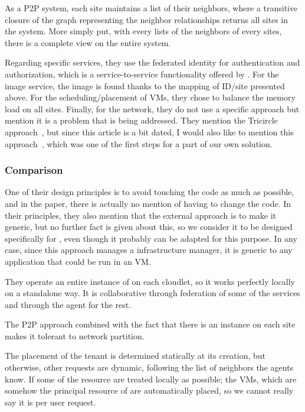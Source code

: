 %
As a \acrshort{P2P} system, each site maintains a list of their
neighbors, where a transitive closure of the graph representing the
neighbor relationships returns all sites in the system.
%
More simply put, with every lists of the neighbors of every sites,
there is a complete view on the entire system.

Regarding specific services, they use the federated identity for
authentication and authorization, which is a service-to-service
functionality offered by \os.
%
For the image service, the image is found thanks to the mapping of
ID/site presented above.
%
For the scheduling/placement of VMs, they chose to balance the memory
load on all sites.
%
Finally, for the network, they do not use a specific approach but
mention it is a problem that is being addressed.
%
They mention the Tricircle approach~\cite{tricircle}, but since this
article is a bit dated, I would also like to mention this
approach~\cite{ELNC20}, which was one of the first steps for a part of
our own solution.


\subsubsection*{Comparison}

One of their design principles is to avoid touching the code as much
as possible, and in the paper, there is actually no mention of having
to change the code.
%
In their principles, they also mention that the external approach is
to make it generic, but no further fact is given about this, so we
consider it to be designed specifically for \os, even though it
probably can be adapted for this purpose.
%
In any case, since this approach manages a infrastructure manager, it
is generic to any application that could be run in an \os VM.

They operate an entire instance of \os on each cloudlet, so it works
perfectly locally on a standalone way.
%
It is collaborative through federation of some of the services and
through the agent for the rest.

The \acrshort{P2P} approach combined with the fact that there is an instance on
each site makes it tolerant to network partition.

The placement of the tenant is determined statically at its creation,
but otherwise, other requests are dynamic, following the list of
neighbors the agents know.
%
If some of the resource are treated locally as possible; the VMs,
which are somehow the principal resource of \os are automatically
placed, so we cannot really say it is per user request.

